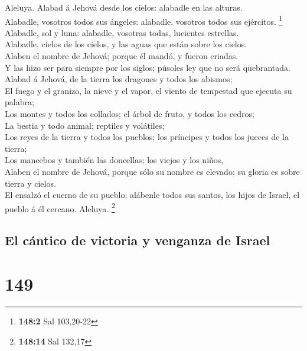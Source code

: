  Aleluya. Alabad á Jehová desde los cielos: alabadle en
las alturas.\\
 Alabadle, vosotros todos sus ángeles: alabadle, vosotros
todos sus ejércitos. \footnote{\textbf{148:2} Sal 103,20-22}\\
 Alabadle, sol y luna: alabadle, vosotras todas, lucientes
estrellas.\\
 Alabadle, cielos de los cielos, y las aguas que están
sobre los cielos.\\
 Alaben el nombre de Jehová; porque él mandó, y fueron
criadas.\\
 Y las hizo ser para siempre por los siglos; púsoles ley
que no será quebrantada.\\
 Alabad á Jehová, de la tierra los dragones y todos los
abismos;\\
 El fuego y el granizo, la nieve y el vapor, el viento de
tempestad que ejecuta su palabra;\\
 Los montes y todos los collados; el árbol de fruto, y
todos los cedros;\\
 La bestia y todo animal; reptiles y volátiles;\\
 Los reyes de la tierra y todos los pueblos; los
príncipes y todos los jueces de la tierra;\\
 Los mancebos y también las doncellas; los viejos y los
niños,\\
 Alaben el nombre de Jehová, porque sólo su nombre es
elevado; su gloria es sobre tierra y cielos.\\
 El ensalzó el cuerno de su pueblo; alábenle todos sus
santos, los hijos de Israel, el pueblo á él cercano. Aleluya.
\footnote{\textbf{148:14} Sal 132,17}

\hypertarget{el-cuxe1ntico-de-victoria-y-venganza-de-israel}{%
\subsection{El cántico de victoria y venganza de
Israel}\label{el-cuxe1ntico-de-victoria-y-venganza-de-israel}}

\hypertarget{section-148}{%
\section{149}\label{section-148}}

